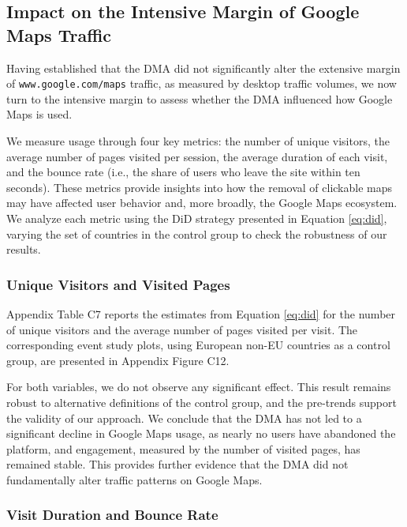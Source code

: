 \documentclass[11pt]{article}
\begin{document}
	\subsection{Impact on the Intensive Margin of Google Maps Traffic} \label{subsec:google_maps_extra_variables}
	
	Having established that the DMA did not significantly alter the extensive margin of \texttt{www.google.com/maps} traffic, as measured by desktop traffic volumes, we now turn to the intensive margin to assess whether the DMA influenced how Google Maps is used. 
	
	We measure usage through four key metrics: the number of unique visitors, the average number of pages visited per session, the average duration of each visit, and the bounce rate (i.e., the share of users who leave the site within ten seconds).  These metrics provide insights into how the removal of clickable maps may have affected user behavior and, more broadly, the Google Maps ecosystem. We analyze each metric using the DiD strategy presented in Equation \ref{eq:did}, varying the set of countries in the control group to check the robustness of our results.
	
	
	\subsubsection{Unique Visitors and Visited Pages} \label{subsec: visitors pages visited}
	
	Appendix Table C7 reports the estimates from Equation \ref{eq:did} for the number of unique visitors and the average number of pages visited per visit. The corresponding event study plots, using European non-EU countries as a control group, are presented in Appendix Figure C12.  
	
	For both variables, we do not observe any significant effect. This result remains robust to alternative definitions of the control group, and the pre-trends support the validity of our approach. We conclude that the DMA has not led to a significant decline in Google Maps usage, as nearly no users have abandoned the platform, and engagement, measured by the number of visited pages, has remained stable. This provides further evidence that the DMA did not fundamentally alter traffic patterns on Google Maps.  
	
	
	\subsubsection{Visit Duration and Bounce Rate} \label{subsec:google_duration_bounce}
	
\end{document}
